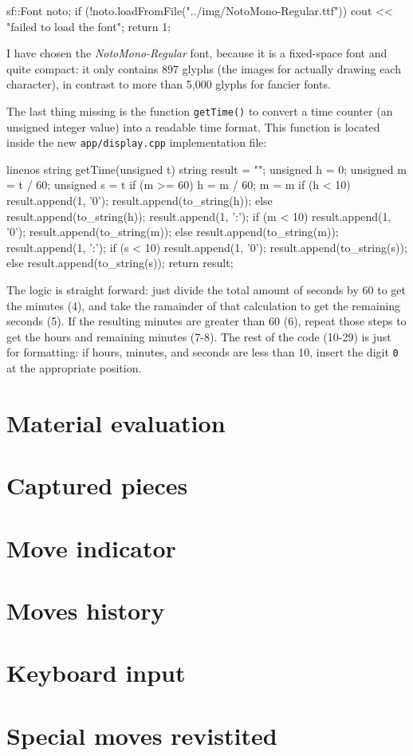 \begin{cpp}
sf::Font noto;
if (!noto.loadFromFile("../img/NotoMono-Regular.ttf")) {
  cout << "failed to load the font\n";
  return 1;
}
\end{cpp}

I have chosen the \emph{NotoMono-Regular} font, because it is a fixed-space font and quite compact:
it only contains 897 glyphs (the images for actually drawing each character), in contrast to
more than 5,000 glyphs for fancier fonts.

The last thing missing is the function \texttt{getTime()} to convert a time counter (an unsigned
integer value) into a readable time format. This function is located inside the new
\texttt{app/display.cpp} implementation file:

\begin{cpp*}{linenos}
string getTime(unsigned t) {
  string result = "";
  unsigned h = 0;
  unsigned m = t / 60;
  unsigned s = t %
  if (m >= 60) {
    h = m / 60;
    m = m %
  }
  if (h < 10) {
    result.append(1, '0');
    result.append(to_string(h));
  } else {
    result.append(to_string(h));
  }
  result.append(1, ':');
  if (m < 10) {
    result.append(1, '0');
    result.append(to_string(m));
  } else {
    result.append(to_string(m));
  }
  result.append(1, ':');
  if (s < 10) {
    result.append(1, '0');
    result.append(to_string(s));
  } else {
    result.append(to_string(s));
  }
  return result;
}
\end{cpp*}

The logic is straight forward: just divide the total amount of seconds by 60 to get the minutes (4),
and take the ramainder of that calculation to get the remaining seconds (5).
If the resulting minutes are greater than 60 (6), repeat those steps to get the hours and remaining
minutes (7-8).
The rest of the code (10-29) is just for formatting: if hours, minutes, and seconds are less than 10,
insert the digit \texttt{0}  at the appropriate position.

\section{Material evaluation}

\section{Captured pieces}

\section{Move indicator}

\section{Moves history}

\section{Keyboard input}

\section{Special moves revistited}

